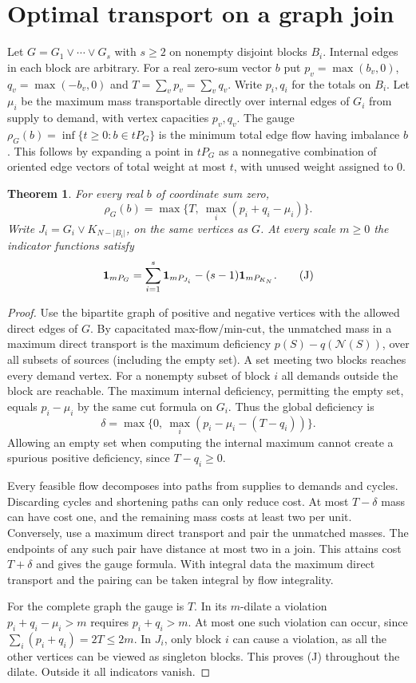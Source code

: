 \documentclass[11pt,a4paper]{article}
\newtheorem{theorem}{Theorem}[section]
\theoremstyle{definition}\newtheorem{problem}[theorem]{Problem}
\begin{document}
\section{Optimal transport on a graph join}
Let $G=G_1\vee\cdots\vee G_s$ with $s\ge2$ on nonempty disjoint blocks $B_i$. Internal edges in each block are arbitrary. For a real zero-sum vector $b$ put $p_v=\max(b_v,0)$, $q_v=\max(-b_v,0)$ and $T=\sum_v p_v=\sum_v q_v$. Write $p_i,q_i$ for the totals on $B_i$. Let $\mu_i$ be the maximum mass transportable directly over internal edges of $G_i$ from supply to demand, with vertex capacities $p_v,q_v$. The gauge $\rho_G(b)=\inf\{t\ge0:b\in tP_G\}$ is the minimum total edge flow having imbalance $b$. This follows by expanding a point in $tP_G$ as a nonnegative combination of oriented edge vectors of total weight at most $t$, with unused weight assigned to $0$.

\begin{theorem}\label{th:join}
For every real $b$ of coordinate sum zero,
\[
 \rho_G(b)=\max\{T,\ \max_i(p_i+q_i-\mu_i)\}.
\]
Write $J_i=G_i\vee K_{N-|B_i|}$, on the same vertices as $G$. At every scale $m\ge0$ the indicator functions satisfy
\[
 {\bf1}_{mP_G}=\sum_{i=1}^s{\bf1}_{mP_{J_i}}-(s-1){\bf1}_{mP_{K_N}}. \tag{J}
\]
\end{theorem}

\begin{proof}
Use the bipartite graph of positive and negative vertices with the allowed direct edges of $G$. By capacitated max-flow/min-cut, the unmatched mass in a maximum direct transport is the maximum deficiency $p(S)-q(\mathcal N(S))$, over all subsets of sources (including the empty set). A set meeting two blocks reaches every demand vertex. For a nonempty subset of block $i$ all demands outside the block are reachable. The maximum internal deficiency, permitting the empty set, equals $p_i-\mu_i$ by the same cut formula on $G_i$. Thus the global deficiency is
\[
 \delta=\max\{0,\ \max_i(p_i-\mu_i-(T-q_i))\}.
\]
Allowing an empty set when computing the internal maximum cannot create a spurious positive deficiency, since $T-q_i\ge0$.

Every feasible flow decomposes into paths from supplies to demands and cycles. Discarding cycles and shortening paths can only reduce cost. At most $T-\delta$ mass can have cost one, and the remaining mass costs at least two per unit. Conversely, use a maximum direct transport and pair the unmatched masses. The endpoints of any such pair have distance at most two in a join. This attains cost $T+\delta$ and gives the gauge formula. With integral data the maximum direct transport and the pairing can be taken integral by flow integrality.

For the complete graph the gauge is $T$. In its $m$-dilate a violation $p_i+q_i-\mu_i>m$ requires $p_i+q_i>m$. At most one such violation can occur, since $\sum_i(p_i+q_i)=2T\le2m$. In $J_i$, only block $i$ can cause a violation, as all the other vertices can be viewed as singleton blocks. This proves (J) throughout the dilate. Outside it all indicators vanish.
\end{proof}
\end{document}
